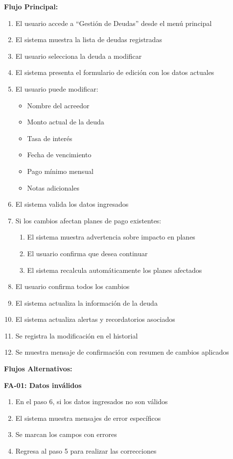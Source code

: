 \noindent\textbf{Flujo Principal:}
\begin{enumerate}
    \item El usuario accede a ``Gestión de Deudas'' desde el menú principal
    \item El sistema muestra la lista de deudas registradas
    \item El usuario selecciona la deuda a modificar
    \item El sistema presenta el formulario de edición con los datos actuales
    \item El usuario puede modificar:
    \begin{itemize}
        \item Nombre del acreedor
        \item Monto actual de la deuda
        \item Tasa de interés
        \item Fecha de vencimiento
        \item Pago mínimo mensual
        \item Notas adicionales
    \end{itemize}
    \item El sistema valida los datos ingresados
    \item Si los cambios afectan planes de pago existentes:
    \begin{enumerate}
        \item El sistema muestra advertencia sobre impacto en planes
        \item El usuario confirma que desea continuar
        \item El sistema recalcula automáticamente los planes afectados
    \end{enumerate}
    \item El usuario confirma todos los cambios
    \item El sistema actualiza la información de la deuda
    \item El sistema actualiza alertas y recordatorios asociados
    \item Se registra la modificación en el historial
    \item Se muestra mensaje de confirmación con resumen de cambios aplicados
\end{enumerate}

\noindent\textbf{Flujos Alternativos:}

\textbf{FA-01: Datos inválidos}
\begin{enumerate}
    \item En el paso 6, si los datos ingresados no son válidos
    \item El sistema muestra mensajes de error específicos
    \item Se marcan los campos con errores
    \item Regresa al paso 5 para realizar las correcciones
\end{enumerate}

